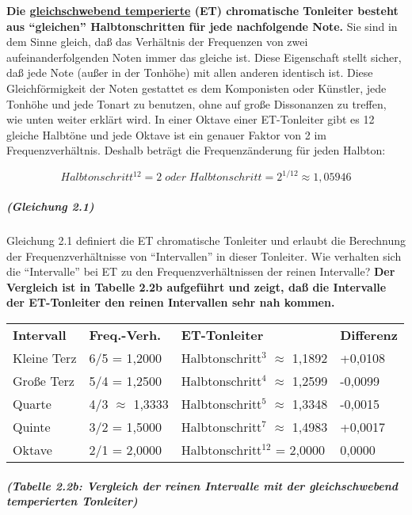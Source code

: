 \textbf{Die \hyperlink{et}{gleichschwebend temperierte} (ET) chromatische Tonleiter besteht aus \enquote{gleichen} Halbtonschritten für jede nachfolgende Note.}
 Sie sind in dem Sinne gleich, daß das Verhältnis der Frequenzen von zwei aufeinanderfolgenden Noten immer das gleiche ist.
 Diese Eigenschaft stellt sicher, daß jede Note (außer in der Tonhöhe) mit allen anderen identisch ist.
 Diese Gleichförmigkeit der Noten gestattet es dem Komponisten oder Künstler, jede Tonhöhe und jede Tonart zu benutzen, ohne auf große Dissonanzen zu treffen, wie unten weiter erklärt wird.
 In einer Oktave einer ET-Tonleiter gibt es 12 gleiche Halbtöne und jede Oktave ist ein genauer Faktor von 2 im Frequenzverhältnis.
 Deshalb beträgt die Frequenzänderung für jeden Halbton:
 \hypertarget{gleich21}{}

\begin{equation}
 Halbtonschritt^{12}=2\;oder\;Halbtonschritt=2^{1/12} \approx 1,05946
\end{equation}


\subparagraph{(Gleichung 2.1)}

Gleichung 2.1 definiert die ET chromatische Tonleiter und erlaubt die Berechnung der Frequenzverhältnisse von \enquote{Intervallen} in dieser Tonleiter.
 Wie verhalten sich die \enquote{Intervalle} bei ET zu den Frequenzverhältnissen der reinen Intervalle?
 \textbf{Der Vergleich ist in Tabelle 2.2b aufgeführt und zeigt, daß die Intervalle der ET-Tonleiter den reinen Intervallen sehr nah kommen.}
\begin{tabular}{llll}
\textbf{Intervall} & \textbf{Freq.-Verh.} & \textbf{ET-Tonleiter} & \textbf{Differenz} \\ 
Kleine Terz & 6/5 = 1,2000 & Halbtonschritt$^3$ $\approx$ 1,1892 & +0,0108 \\ 
Große Terz & 5/4 = 1,2500 & Halbtonschritt$^4$ $\approx$ 1,2599 & -0,0099 \\ 
Quarte & 4/3 $\approx$ 1,3333 & Halbtonschritt$^5$ $\approx$ 1,3348 & -0,0015 \\ 
Quinte & 3/2 = 1,5000 & Halbtonschritt$^7$ $\approx$ 1,4983 & +0,0017 \\ 
Oktave & 2/1 = 2,0000 & Halbtonschritt$^12$ = 2,0000 & 0,0000
\end{tabular}

\subparagraph{(Tabelle 2.2b: Vergleich der reinen Intervalle mit der gleichschwebend temperierten Tonleiter)}

